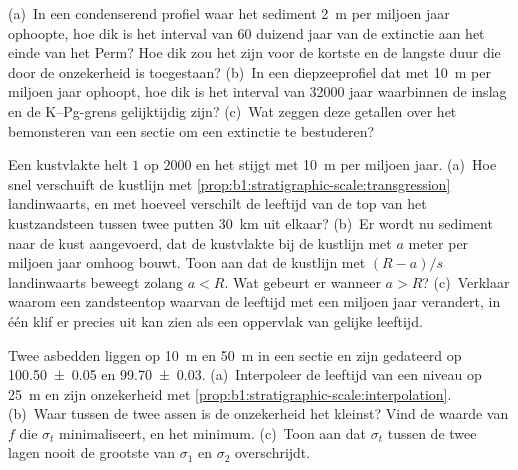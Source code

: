 \begin{exercise}[$\star\star$]\label{exo:b1:stratigraphic-scale:9}
(a)~In een condenserend profiel waar het sediment \qty{2}{m} per miljoen jaar ophoopte, hoe dik is het interval van \num{60} duizend jaar van de extinctie aan het einde van het Perm? Hoe dik zou het zijn voor de kortste en de langste duur die door de onzekerheid is toegestaan? (b)~In een diepzeeprofiel dat met \qty{10}{m} per miljoen jaar ophoopt, hoe dik is het interval van \num{32000} jaar waarbinnen de inslag en de K--Pg-grens gelijktijdig zijn? (c)~Wat zeggen deze getallen over het bemonsteren van een sectie om een extinctie te bestuderen?
\end{exercise}

\begin{exercise}[$\star\star\star$]\label{exo:b1:stratigraphic-scale:10}
Een kustvlakte helt $1$ op $2000$ en het  stijgt met \qty{10}{m} per miljoen jaar. (a)~Hoe snel verschuift de kustlijn met \cref{prop:b1:stratigraphic-scale:transgression} landinwaarts, en met hoeveel verschilt de leeftijd van de top van het kustzandsteen tussen twee putten \qty{30}{km} uit elkaar? (b)~Er wordt nu sediment naar de kust aangevoerd, dat de kustvlakte bij de kustlijn met $a$ meter per miljoen jaar omhoog bouwt. Toon aan dat de kustlijn met $(R - a)/s$ landinwaarts beweegt zolang $a < R$. Wat gebeurt er wanneer $a > R$? (c)~Verklaar waarom een zandsteentop waarvan de leeftijd met een miljoen jaar verandert, in één klif er precies uit kan zien als een oppervlak van gelijke leeftijd.
\end{exercise}

\begin{exercise}[$\star\star\star$]\label{exo:b1:stratigraphic-scale:11}
Twee asbedden liggen op \qty{10}{m} en \qty{50}{m} in een sectie en zijn gedateerd op \qty[uncertainty-mode=separate]{100.50(5)}{\Ma} en \qty[uncertainty-mode=separate]{99.70(3)}{\Ma}. (a)~Interpoleer de leeftijd van een niveau op \qty{25}{m} en zijn onzekerheid met \cref{prop:b1:stratigraphic-scale:interpolation}. (b)~Waar tussen de twee assen is de onzekerheid het kleinst? Vind de waarde van $f$ die $\sigma_t$ minimaliseert, en het minimum. (c)~Toon aan dat $\sigma_t$ tussen de twee lagen nooit de grootste van $\sigma_1$ en $\sigma_2$ overschrijdt.
\end{exercise}

